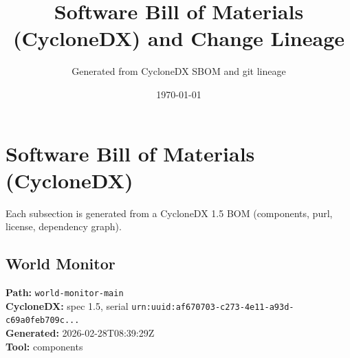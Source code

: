 \documentclass[11pt]{article}
\title{Software Bill of Materials (CycloneDX) and Change Lineage}
\author{Generated from CycloneDX SBOM and git lineage}
\date{\today}
\begin{document}
\maketitle
\tableofcontents
\newpage
\section{Software Bill of Materials (CycloneDX)}
Each subsection is generated from a CycloneDX 1.5 BOM (components, purl, license, dependency graph).

\subsection{World Monitor}
\textbf{Path:} \texttt{world-monitor-main}
\\ \textbf{CycloneDX:} spec 1.5, serial \texttt{urn:uuid:af670703-c273-4e11-a93d-c69a0feb709c...}
\\ \textbf{Generated:} 2026-02-28T08:39:29Z
\\ \textbf{Tool:} components
\end{document}
